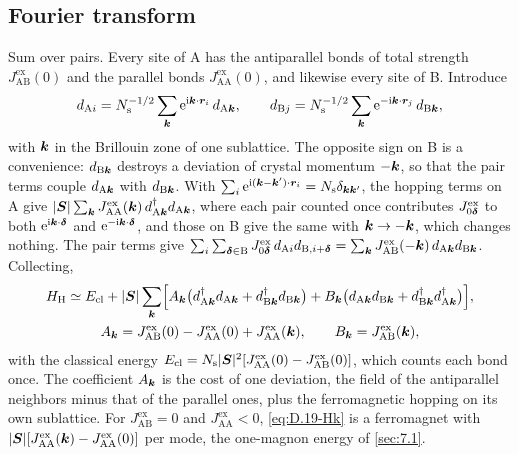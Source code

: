 \subsection*{Fourier transform}

Sum over pairs. Every site of A has the antiparallel bonds of total strength $J^{\mathrm{ex}}_{\mathrm{AB}}(0)$ and the parallel bonds $J^{\mathrm{ex}}_{\mathrm{AA}}(0)$, and likewise every site of B. Introduce
\begin{equation*}
  d_{\mathrm{A}i} = N_{\mathrm{s}}^{-1/2}\sum_{\bm{k}}\mathrm{e}^{\mathrm{i}\bm{k}\cdot\bm{r}_i}\,d_{\mathrm{A}\bm{k}}, \qquad
  d_{\mathrm{B}j} = N_{\mathrm{s}}^{-1/2}\sum_{\bm{k}}\mathrm{e}^{-\mathrm{i}\bm{k}\cdot\bm{r}_j}\,d_{\mathrm{B}\bm{k}} ,
\end{equation*}
with $\bm{k}$ in the Brillouin zone of one sublattice. The opposite sign on B is a convenience: $d_{\mathrm{B}\bm{k}}$ destroys a deviation of crystal momentum $-\bm{k}$, so that the pair terms couple $d_{\mathrm{A}\bm{k}}$ with $d_{\mathrm{B}\bm{k}}$. With $\sum_i\mathrm{e}^{\mathrm{i}(\bm{k}-\bm{k}')\cdot\bm{r}_i} = N_{\mathrm{s}}\delta_{\bm{k}\bm{k}'}$, the hopping terms on A give $|\bm{S}|\sum_{\bm{k}}J^{\mathrm{ex}}_{\mathrm{AA}}(\bm{k})\,d^\dagger_{\mathrm{A}\bm{k}}d_{\mathrm{A}\bm{k}}$, where each pair counted once contributes $J^{\mathrm{ex}}_{0\bm{\delta}}$ to both $\mathrm{e}^{\mathrm{i}\bm{k}\cdot\bm{\delta}}$ and $\mathrm{e}^{-\mathrm{i}\bm{k}\cdot\bm{\delta}}$, and those on B give the same with $\bm{k} \to -\bm{k}$, which changes nothing. The pair terms give $\sum_i\sum_{\bm{\delta}\in\mathrm{B}}J^{\mathrm{ex}}_{0\bm{\delta}}\,d_{\mathrm{A}i}d_{\mathrm{B},i+\bm{\delta}} = \sum_{\bm{k}}J^{\mathrm{ex}}_{\mathrm{AB}}(-\bm{k})\,d_{\mathrm{A}\bm{k}}d_{\mathrm{B}\bm{k}}$. Collecting,
\begin{equation}
  \begin{gathered}
  H_{\mathrm{H}} \simeq E_{\mathrm{cl}} + |\bm{S}|\sum_{\bm{k}}\Bigl[A_{\bm{k}}\bigl(d^\dagger_{\mathrm{A}\bm{k}}d_{\mathrm{A}\bm{k}} + d^\dagger_{\mathrm{B}\bm{k}}d_{\mathrm{B}\bm{k}}\bigr) + B_{\bm{k}}\bigl(d_{\mathrm{A}\bm{k}}d_{\mathrm{B}\bm{k}} + d^\dagger_{\mathrm{B}\bm{k}}d^\dagger_{\mathrm{A}\bm{k}}\bigr)\Bigr] , \\
  A_{\bm{k}} = J^{\mathrm{ex}}_{\mathrm{AB}}(0) - J^{\mathrm{ex}}_{\mathrm{AA}}(0) + J^{\mathrm{ex}}_{\mathrm{AA}}(\bm{k}), \qquad B_{\bm{k}} = J^{\mathrm{ex}}_{\mathrm{AB}}(\bm{k}) ,
  \end{gathered}
  \label{eq:D.19-Hk}
\end{equation}
with the classical energy $E_{\mathrm{cl}} = N_{\mathrm{s}}|\bm{S}|^2[J^{\mathrm{ex}}_{\mathrm{AA}}(0) - J^{\mathrm{ex}}_{\mathrm{AB}}(0)]$, which counts each bond once. The coefficient $A_{\bm{k}}$ is the cost of one deviation, the field of the antiparallel neighbors minus that of the parallel ones, plus the ferromagnetic hopping on its own sublattice. For $J^{\mathrm{ex}}_{\mathrm{AB}} = 0$ and $J^{\mathrm{ex}}_{\mathrm{AA}} < 0$, \cref{eq:D.19-Hk} is a ferromagnet with $|\bm{S}|[J^{\mathrm{ex}}_{\mathrm{AA}}(\bm{k}) - J^{\mathrm{ex}}_{\mathrm{AA}}(0)]$ per mode, the one-magnon energy of \cref{sec:7.1}.

